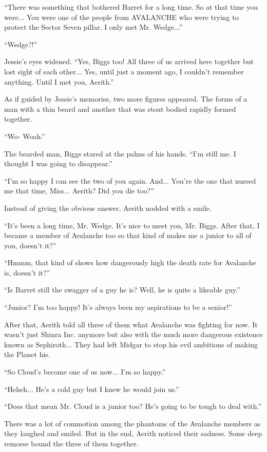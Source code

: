 \documentclass[oneside]{book}
\begin{document}
“There was something that bothered Barret for a long time. So at that time you were... You were one of the people from AVALANCHE who were trying to protect the Sector Seven pillar. I only met Mr. Wedge...”

“Wedge?!”

Jessie's eyes widened. “Yes, Biggs too! All three of us arrived here together but lost sight of each other... Yes, until just a moment ago, I couldn't remember anything. Until I met you, Aerith.”

As if guided by Jessie's memories, two more figures appeared. The forms of a man with a thin beard and another that was stout bodied rapidly formed together.

“Wo- Woah.”

The bearded man, Biggs stared at the palms of his hands. “I'm still me. I thought I was going to disappear.”

“I'm so happy I can see the two of you again. And... You're the one that nursed me that time, Miss... Aerith? Did you die too?”

Instead of giving the obvious answer, Aerith nodded with a smile.

“It's been a long time, Mr. Wedge. It's nice to meet you, Mr. Biggs. After that, I became a member of Avalanche too so that kind of makes me a junior to all of you, doesn't it?”

“Hmmm, that kind of shows how dangerously high the death rate for Avalanche is, doesn't it?”

“Is Barret still the swagger of a guy he is? Well, he is quite a likeable guy.”

“Junior? I'm too happy! It's always been my aspirations to be a senior!”

After that, Aerith told all three of them what Avalanche was fighting for now. It wasn't just Shinra Inc. anymore but also with the much more dangerous existence known as Sephiroth... They had left Midgar to stop his evil ambitions of making the Planet his.

“So Cloud's become one of us now... I'm so happy.”

“Heheh... He's a cold guy but I knew he would join us.”

“Does that mean Mr. Cloud is a junior too? He's going to be tough to deal with.”

There was a lot of commotion among the phantoms of the Avalanche members as they laughed and smiled. But in the end, Aerith noticed their sadness. Some deep remorse bound the three of them together.
\end{document}
